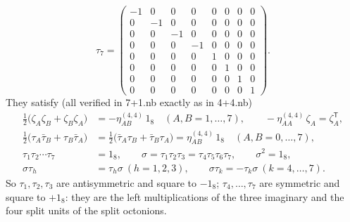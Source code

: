 \documentclass[10pt,a4paper]{article}
\begin{document}
\begin{equation*}
\tau_7=\begin{pmatrix}-1 & 0 & 0 & 0 & 0 & 0 & 0 & 0 \\ 0 & -1 & 0 & 0 & 0 & 0 & 0 & 0 \\ 0 & 0 & -1 & 0 & 0 & 0 & 0 & 0 \\ 0 & 0 & 0 & -1 & 0 & 0 & 0 & 0 \\ 0 & 0 & 0 & 0 & 1 & 0 & 0 & 0 \\ 0 & 0 & 0 & 0 & 0 & 1 & 0 & 0 \\ 0 & 0 & 0 & 0 & 0 & 0 & 1 & 0 \\ 0 & 0 & 0 & 0 & 0 & 0 & 0 & 1\end{pmatrix}.
\end{equation*}
They satisfy (all verified in 7+1.nb exactly as in 4+4.nb)
\begin{align*}
\tfrac12\big(\zeta_A\zeta_B+\zeta_B\zeta_A\big)&=-\eta^{(4,4)}_{AB}\,1_8\quad(A,B=1,\dots,7),\qquad -\eta^{(4,4)}_{AA}\,\zeta_A=\zeta_A^{\mathsf T}, \\
\tfrac12\big(\tau_A\bar\tau_B+\tau_B\bar\tau_A\big)&=\tfrac12\big(\bar\tau_A\tau_B+\bar\tau_B\tau_A\big)=\eta^{(4,4)}_{AB}\,1_8\quad(A,B=0,\dots,7), \\
\tau_1\tau_2\cdots\tau_7&=1_8,\qquad \sigma=\tau_1\tau_2\tau_3=\tau_4\tau_5\tau_6\tau_7,\qquad \sigma^2=1_8, \\
\sigma\tau_h&=\tau_h\sigma\ (h=1,2,3),\qquad \sigma\tau_k=-\tau_k\sigma\ (k=4,\dots,7).
\end{align*}
So $\tau_1,\tau_2,\tau_3$ are antisymmetric and square to $-1_8$; $\tau_4,\dots,\tau_7$ are symmetric and square to $+1_8$: they are the left multiplications of the three imaginary and the four split units of the split octonions.
\end{document}
